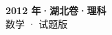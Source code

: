 \documentclass[zihao=-4, a4paper]{ctexart}
\begin{document}
\begin{center}
  {\Large\bfseries 2012 年·湖北卷·理科}\\[4pt]
  {\large 数学 · 试题版}
\end{center}
\medskip
{}

\end{document}
